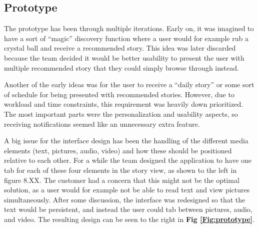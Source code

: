 \subsection{Prototype}

The prototype has been through multiple iterations. Early on, it was imagined to have a sort of “magic” discovery function where a user would for example rub a crystal ball and receive a recommended story. This idea was later discarded because the team decided it would be better usability to present the user with multiple recommended story that they could simply browse through instead.\newline

Another of the early ideas was for the user to receive a “daily story” or some sort of schedule for being presented with recommended stories. However, due to workload and time constraints, this requirement was heavily down prioritized. The most important parts were the personalization and usability aspects, so receiving notifications seemed like an unnecessary extra feature.\newline

A big issue for the interface design has been the handling of the different media elements (text, pictures, audio, video) and how these should be positioned relative to each other. For a while the team designed the application to have one tab for each of these four elements in the story view, as shown to the left in figure 8.XX. The customer had a concern that this might not be the optimal solution, as a user would for example not be able to read text and view pictures simultaneously. After some discussion, the interface was redesigned so that the text would be persistent, and instead the user could tab between pictures, audio, and video. The resulting design can be seen to the right in \textbf{Fig \ref{Fig:prototype}}. 

